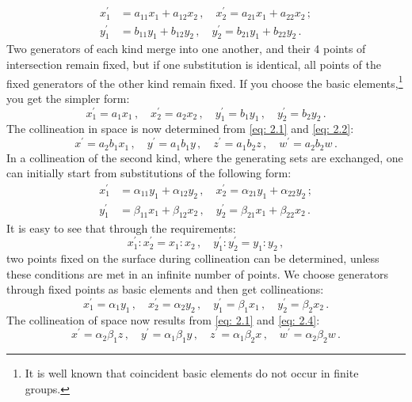 \documentclass[leqno]{article}
\begin{document}
\begin{align*}
	x_1^\prime &= a_{11} x_1 + a_{12} x_2 \, , \quad x_2^\prime = a_{21} x_1 + a_{22} x_2 \, ; \\
	y_1^\prime &= b_{11} y_1 + b_{12} y_2 \, , \quad y_2^\prime = b_{21} y_1 + b_{22} y_2 \, . 
\end{align*}
Two generators of each kind merge into one another, and their 4 points of intersection remain fixed, but if one substitution is identical, all points of the fixed generators of the other kind remain fixed. If you choose the basic elements,\footnote{It is well known that coincident basic elements do not occur in finite groups.} you get the simpler form:
\begin{equation}\label{eq: 2.2}
x_1^\prime = a_1 x_1 \, , \quad x_2^\prime = a_2 x_2 \, , \quad y_1^\prime = b_1 y_1 \, , \quad y_2^\prime = b_2 y_2 \, . \tag{2}
\end{equation}
The collineation in space is now determined from \eqref{eq: 2.1} and \eqref{eq: 2.2}:
\begin{equation}\label{eq: 2.3}
x^\prime = a_2 b_1 x_1 \, , \quad y^\prime = a_1 b_1 y \, , \quad z^\prime = a_1 b_2 z \, , \quad w^\prime = a_2 b_2 w \, . \tag{3}
\end{equation}
In a collineation of the second kind, where the generating sets are exchanged, one can initially start from substitutions of the following form:
\begin{align*}
	x_1^\prime &= \alpha_{11} y_1 + \alpha_{12} y_2 \, , \quad x_2^\prime = \alpha_{21} y_1 + \alpha_{22} y_2 \, ; \\
	y_1^\prime &= \beta_{11} x_1 + \beta_{12} x_2 \, , \quad y_2^\prime = \beta_{21} x_1 + \beta_{22} x_2 \, . 
\end{align*}
It is easy to see that through the requirements:
\[
x_1^\prime : x_2^\prime = x_1 : x_2 \, , \quad y_1^\prime: y_2^\prime = y_1 : y_2 \, , 
\]
two points fixed on the surface during collineation can be determined, unless these conditions are met in an infinite number of points. We choose generators through fixed points as basic elements and then get collineations: 
\begin{equation}\label{eq: 2.4}
x_1^\prime = \alpha_1 y_1 \, , \quad x_2^\prime = \alpha_2 y_2 \, , \quad y_1^\prime = \beta_1 x_1 \, , \quad y_2^\prime = \beta_2 x_2 \, . \tag{4}
\end{equation}
The collineation of space now results from \eqref{eq: 2.1} and \eqref{eq: 2.4}: 
\begin{equation}\label{eq: 2.5}
x^\prime = \alpha_2 \beta_1 z \, , \quad y^\prime = \alpha_1 \beta_1 y \, , \quad z^\prime = \alpha_1 \beta_2 x \, , \quad w^\prime = \alpha_2 \beta_2 w \, . \tag{5}
\end{equation}
\end{document}

